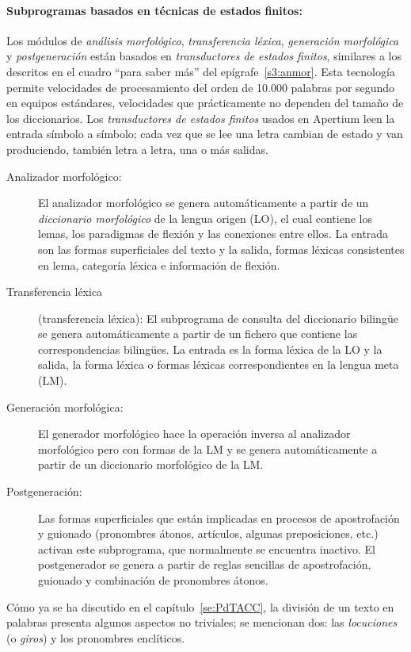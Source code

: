 {\paragraph{Subprogramas basados en técnicas de estados finitos:} Los módulos de \emph{análisis morfológico}, \emph{transferencia léxica}, \emph{generación morfológica} y {\em postgeneración} están basados en \emph{transductores de estados finitos}, similares a los descritos en el cuadro ``para saber más'' del epígrafe~\ref{s3:anmor}. Esta tecnología permite velocidades de procesamiento del orden de 10.000 palabras por segundo en equipos estándares, velocidades que prácticamente no dependen del tamaño de los diccionarios. Los \emph{transductores de estados finitos} usados en Apertium leen la entrada símbolo a símbolo; cada vez que se lee una letra cambian de estado y van produciendo, también letra a letra, una o más salidas. \begin{description} \item[Analizador morfológico:] El analizador morfológico se genera automáticamente a partir de un  \emph{diccionario morfológico} de la lengua origen (LO), el cual contiene los lemas, los paradigmas de flexión y las conexiones entre ellos. La entrada son las formas superficiales del texto y la salida, formas léxicas consistentes en lema, categoría léxica e información de flexión. \item[Transferencia léxica] (transferencia léxica): El subprograma de consulta del diccionario bilingüe se genera automáticamente a partir de un fichero que contiene las correspondencias bilingües. La entrada es la forma léxica de la LO y la salida, la forma léxica o formas léxicas correspondientes en la lengua meta (LM). \item[Generación morfológica:] El generador morfológico hace la operación inversa al analizador morfológico pero con formas de la LM y se genera automáticamente a partir de un diccionario morfológico de la LM. \item[Postgeneración:] Las formas superficiales que están implicadas en procesos de apostrofación y guionado (pronombres átonos, artículos, algunas preposiciones, etc.) activan este subprograma, que normalmente se encuentra inactivo. El postgenerador se genera a partir de reglas sencillas de apostrofación, guionado y combinación de pronombres átonos. \end{description} Cómo ya se ha discutido en el capítulo~\ref{se:PdTACC}, la división de un texto en palabras presenta algunos aspectos no triviales; se  mencionan dos: las \emph{locuciones} (o \emph{giros}) y los pronombres enclíticos. 

}
